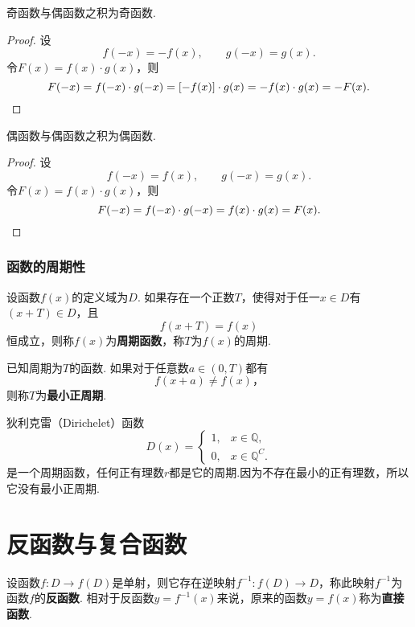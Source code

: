 \begin{property}
奇函数与偶函数之积为奇函数.
\begin{proof}
设\[
f(-x) = -f(x), \qquad g(-x) = g(x).
\]令\(F(x) = f(x) \cdot g(x)\)，则\[
F(-x) = f(-x) \cdot g(-x)
= [-f(x)] \cdot g(x)
= - f(x) \cdot g(x)
= - F(x).
\qedhere
\]
\end{proof}
\end{property}

\begin{property}
偶函数与偶函数之积为偶函数.
\begin{proof}
设\[
f(-x) = f(x), \qquad g(-x) = g(x).
\]令\(F(x) = f(x) \cdot g(x)\)，则\[
F(-x) = f(-x) \cdot g(-x) = f(x) \cdot g(x) = F(x).
\qedhere
\]
\end{proof}
\end{property}

\subsubsection{函数的周期性}
\begin{definition}
设函数\(f(x)\)的定义域为\(D\).
如果存在一个正数\(T\)，使得对于任一\(x \in D\)有\((x + T) \in D\)，且\[
f(x+ T) = f(x)
\]恒成立，则称\(f(x)\)为\textbf{周期函数}，称\(T\)为\(f(x)\)的周期.

已知周期为\(T\)的函数.
如果对于任意数\(a \in (0,T)\)都有\[
f(x + a) \neq f(x)，%
\]则称\(T\)为\textbf{最小正周期}.
\end{definition}

\begin{example}
狄利克雷（Dirichelet）函数\[
D(x) = \left\{ \begin{array}{ll}
1, & x \in \mathbb{Q}, \\
0, & x \in \mathbb{Q}^C.
\end{array} \right.
\]是一个周期函数，任何正有理数\(r\)都是它的周期.因为不存在最小的正有理数，所以它没有最小正周期.
\end{example}

\section{反函数与复合函数}
\begin{definition}[反函数]
设函数\(f\colon D \to f(D)\)是单射，则它存在逆映射\(f^{-1}: f(D) \to D\)，称此映射\(f^{-1}\)为函数\(f\)的\textbf{反函数}.
相对于反函数\(y=f^{-1}(x)\)来说，原来的函数\(y=f(x)\)称为\textbf{直接函数}.
\end{definition}

